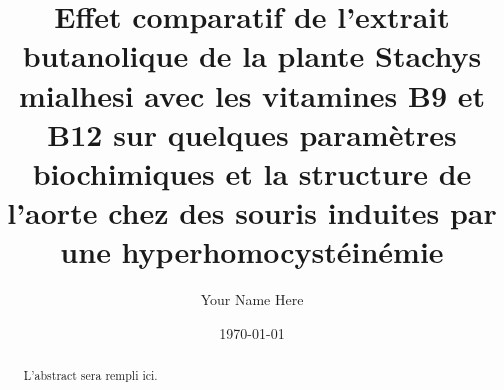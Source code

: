 \title{Effet comparatif de l’extrait butanolique de la plante Stachys mialhesi avec les vitamines B9 et B12 sur quelques paramètres biochimiques et la structure de l’aorte chez des souris induites par une hyperhomocystéinémie}
\author{Your Name Here}
\date{\today}
\maketitle

\begin{abstract}
L'abstract sera rempli ici.
\end{abstract}
